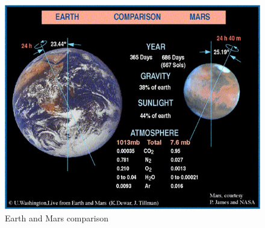 \begin{figure}[h]
    \centering
    \includegraphics[width=.8\linewidth]{figures/image003.jpg}
    \caption{Earth and Mars comparison \cite{gravity}}
    \label{fig:image003.jpg} 
\end{figure}










